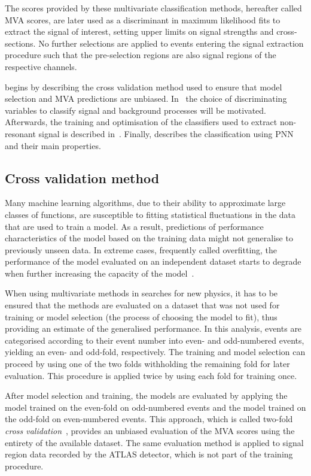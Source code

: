 The scores provided by these multivariate classification methods,
hereafter called MVA scores, are later used as a discriminant in
maximum likelihood fits to extract the signal of interest, setting
upper limits on signal strengths and cross-sections. No further
selections are applied to events entering the signal extraction
procedure such that the pre-selection regions are also signal regions
of the respective channels.

 begins by describing the cross
validation method used to ensure that model selection and MVA
predictions are unbiased.  In~
the choice of discriminating variables to classify signal and
background processes will be motivated. Afterwards, the training and
optimisation of the classifiers used to extract non-resonant signal is
described in~. Finally, 
describes the classification using PNN and their main properties.


\subsection{Cross validation method}
\label{sec:mva_crossvalidation}

Many machine learning algorithms, due to their ability to approximate
large classes of functions, are susceptible to fitting statistical
fluctuations in the data that are used to train a model. As a result,
predictions of performance characteristics of the model based on the
training data might not generalise to previously unseen data. In
extreme cases, frequently called overfitting, the performance of the
model evaluated on an independent dataset starts to degrade when
further increasing the capacity of the model~\cite{hastie09}.

When using multivariate methods in searches for new physics, it has to
be ensured that the methods are evaluated on a dataset that was not
used for training or model selection (the process of choosing the
model to fit), thus providing an estimate of the generalised
performance. In this analysis, events are categorised according to
their event number into even- and odd-numbered events, yielding an
even- and odd-fold, respectively. The training and model selection can
proceed by using one of the two folds withholding the remaining fold
for later evaluation. This procedure is applied twice by using each
fold for training once.

After model selection and training, the models are evaluated by
applying the model trained on the even-fold on odd-numbered events and
the model trained on the odd-fold on even-numbered events. This
approach, which is called two-fold \emph{cross
  validation}~\cite{hastie09,bishop06}, provides an unbiased
evaluation of the MVA scores using the entirety of the available
dataset. The same evaluation method is applied to signal region data
recorded by the ATLAS detector, which is not part of the training
procedure.

